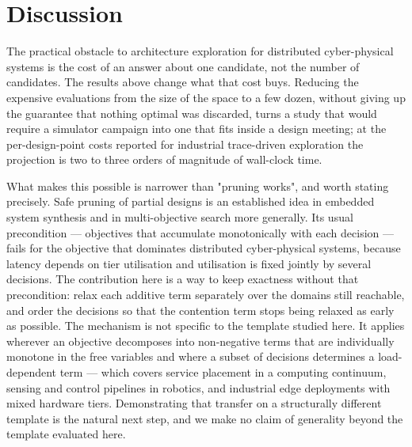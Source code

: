 \section*{Discussion}
\label{sec:ce:discussion}

The practical obstacle to architecture exploration for distributed cyber-physical systems
is the cost of an answer about one candidate, not the number of candidates. The results
above change what that cost buys. Reducing the expensive evaluations from the size of the
space to a few dozen, without giving up the guarantee that nothing optimal was discarded,
turns a study that would require a simulator campaign into one that fits inside a design
meeting; at the per-design-point costs reported for industrial trace-driven
exploration\cite{saadatmand2025compdse} the projection is two to three orders of
magnitude of wall-clock time.

What makes this possible is narrower than "pruning works", and worth stating precisely.
Safe pruning of partial designs is an established idea in embedded system
synthesis\cite{neubauer2018exact,lukasiewycz2008symbolic} and in multi-objective search
more generally\cite{mandow2010namoa,paretopruning2022}. Its usual precondition ---
objectives that accumulate monotonically with each decision --- fails for the objective
that dominates distributed cyber-physical systems, because latency depends on tier
utilisation and utilisation is fixed jointly by several decisions. The contribution here
is a way to keep exactness without that precondition: relax each additive term separately
over the domains still reachable, and order the decisions so that the contention term
stops being relaxed as early as possible. The mechanism is not specific to the template
studied here. It applies wherever an objective decomposes into non-negative terms that
are individually monotone in the free variables and where a subset of decisions
determines a load-dependent term --- which covers service placement in a computing
continuum, sensing and control pipelines in robotics, and industrial edge deployments
with mixed hardware tiers. Demonstrating that transfer on a structurally different
template is the natural next step, and we make no claim of generality beyond the template
evaluated here.


